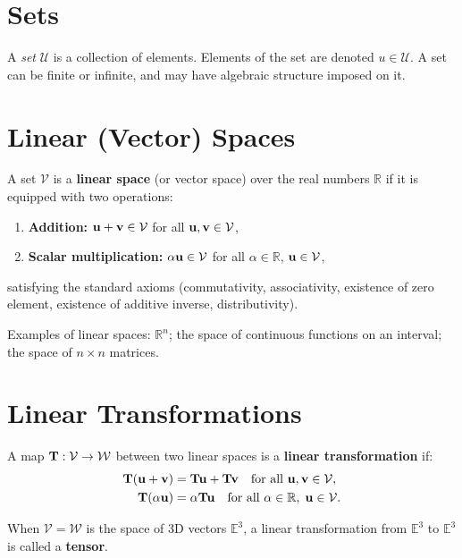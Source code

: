 \documentclass[
  letterpaper,
  DIV=11,
  numbers=noendperiod]{scrreprt}
\providecommand{\tightlist}{%
  \setlength{\itemsep}{0pt}\setlength{\parskip}{0pt}}
\begin{document}
\section{Sets}\label{sets}

A \emph{set} \(\mathcal{U}\) is a collection of elements. Elements of
the set are denoted \(u \in \mathcal{U}\). A set can be finite or
infinite, and may have algebraic structure imposed on it.

\section{Linear (Vector) Spaces}\label{linear-vector-spaces}

A set \(\mathcal{V}\) is a \textbf{linear space} (or vector space) over
the real numbers \(\mathbb{R}\) if it is equipped with two operations:

\begin{enumerate}
\def\labelenumi{\arabic{enumi}.}
\tightlist
\item
  \textbf{Addition:} \({\bf u}+{\bf v} \in \mathcal{V}\) for all
  \({\bf u},{\bf v} \in \mathcal{V}\),
\item
  \textbf{Scalar multiplication:} \(\alpha{\bf u} \in \mathcal{V}\) for
  all \(\alpha \in \mathbb{R}\), \({\bf u} \in \mathcal{V}\),
\end{enumerate}

satisfying the standard axioms (commutativity, associativity, existence
of zero element, existence of additive inverse, distributivity).

Examples of linear spaces: \(\mathbb{R}^n\); the space of continuous
functions on an interval; the space of \(n\times n\) matrices.

\section{Linear Transformations}\label{linear-transformations}

A map \({\bf T}: \mathcal{V} \to \mathcal{W}\) between two linear spaces
is a \textbf{linear transformation} if: \begin{align}
    {\bf T}({\bf u}+{\bf v}) &= {\bf T}{\bf u}+{\bf T}{\bf v} \quad \text{for all } {\bf u},{\bf v} \in \mathcal{V},\\
    {\bf T}(\alpha{\bf u}) &= \alpha{\bf T}{\bf u} \quad \text{for all } \alpha \in \mathbb{R},\; {\bf u} \in \mathcal{V}.
\end{align}

When \(\mathcal{V} = \mathcal{W}\) is the space of 3D vectors
\(\mathbb{E}^3\), a linear transformation from \(\mathbb{E}^3\) to
\(\mathbb{E}^3\) is called a \textbf{tensor}.
\end{document}
